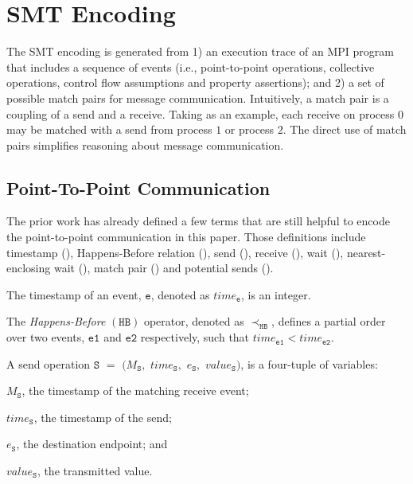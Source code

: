 \section{SMT Encoding}
The SMT encoding is generated from 1) an execution trace of an MPI program that includes a sequence of events (i.e., point-to-point operations, collective operations, control flow assumptions and property assertions); and 2) a set of possible match pairs for message communication. Intuitively, a match pair is a coupling of a send and a receive. Taking  as an example, each receive on process $0$ may be matched with a send from process $1$ or process $2$. The direct use of match pairs simplifies reasoning about message communication. 

\subsection{Point-To-Point Communication}
The prior work has already defined a few terms that are still helpful to encode the point-to-point communication in this paper. Those definitions include timestamp (), Happens-Before relation (), send (), receive (), wait (), nearest-enclosing wait (), match pair () and potential sends ().

\begin{definition}[Timestamp]\label{def:order}
\noindent The timestamp of an event, $\mathtt{e}$, denoted as $\mathit{time}_\mathtt{e}$, is an integer.
\end{definition}

\begin{definition}\label{def:happens-before}
The \emph{Happens-Before} $(\mathtt{HB})$ operator, denoted as
$\mathrm{\prec_\mathtt{HB}}$, defines a partial order over two events, $\mathtt{e1}$ and $\mathtt{e2}$ respectively, such that $\mathit{time}_\mathtt{e1} <  \mathit{time}_\mathtt{e2}$. 
\end{definition}

\begin{definition}[Send] \label{def:snd}
A send operation $\mathtt{S}$ $=$ $(M_\mathtt{S},$ $\mathit{time}_\mathtt{S},$ $e_\mathtt{S},$ $\mathit{value}_\mathtt{S})$, is a four-tuple of variables:
\begin{compactenum}
\item $M_\mathtt{S}$, the timestamp of the matching receive event;
\item $\mathit{time}_\mathtt{S}$, the timestamp of the send;
\item $e_\mathtt{S}$, the destination endpoint; and
\item $\mathit{value}_\mathtt{S}$, the transmitted value.
\end{compactenum}
\end{definition}

